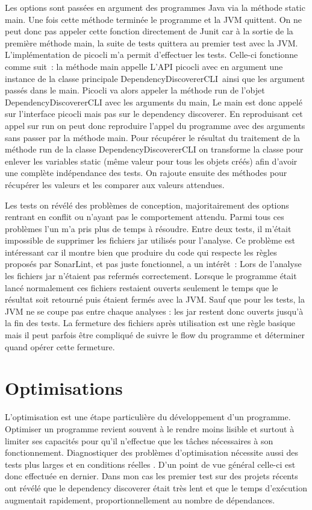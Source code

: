 \documentclass[french,a4paper,12pt]{report}
\begin{document}
Les options sont passées en argument des programmes Java via la méthode static main. Une fois cette méthode terminée le programme et la JVM quittent. On ne peut donc pas appeler cette fonction directement de Junit car à la sortie de la première méthode main, la suite de tests quittera au premier test avec la JVM. 
L’implémentation de picocli m’a permit d’effectuer les tests. Celle-ci fonctionne comme suit : la méthode main appelle L’API picocli avec en argument une instance de la classe principale DependencyDiscovererCLI ainsi que les argument passés dans le main.
Picocli va alors appeler la méthode run de l'objet DependencyDiscovererCLI avec les arguments du main, Le main est donc appelé sur l'interface picocli mais pas sur le dependency discoverer.
En reproduisant cet appel sur run on peut donc reproduire l’appel du programme avec des arguments sans passer par la méthode main.
Pour récupérer le résultat du traitement de la méthode run de la classe DependencyDiscovererCLI on transforme la classe pour enlever les variables static (même valeur pour tous les objets créés) afin d’avoir une complète indépendance des tests. On rajoute ensuite des méthodes pour récupérer les valeurs et les comparer aux valeurs attendues.

Les tests on révélé des problèmes de conception, majoritairement des options rentrant en conflit ou n’ayant pas le comportement attendu. Parmi tous ces problèmes l'un m’a pris plus de temps à résoudre. Entre deux tests, il m’était impossible de supprimer les fichiers jar utilisés pour l’analyse. Ce problème est intéressant car il montre bien que produire du code qui respecte les règles proposés par SonarLint,  et pas juste fonctionnel, a un intérêt : 
Lors de l'analyse les fichiers jar n'étaient pas refermés correctement. Lorsque le programme était lancé normalement ces fichiers restaient ouverts seulement le temps que le résultat soit retourné puis étaient fermés avec la JVM. Sauf que pour les tests, la JVM ne se coupe pas entre chaque analyses : les jar restent donc ouverts jusqu’à la fin des tests. 
La fermeture des fichiers après utilisation est une règle basique mais il peut parfois être compliqué de suivre le flow du programme et déterminer quand opérer cette fermeture.

\section{Optimisations}
L’optimisation est une étape particulière du développement d’un programme. Optimiser un programme revient souvent à le rendre moins lisible et surtout à limiter ses capacités pour qu’il n’effectue que les tâches nécessaires à son fonctionnement. Diagnostiquer des problèmes d’optimisation nécessite aussi des tests plus larges et en conditions réelles . D’un point de vue général celle-ci est donc effectuée en dernier. 
Dans mon cas les premier test sur des projets récents ont révélé que le dependency discoverer était très lent et que le temps d’exécution augmentait rapidement, proportionnellement au nombre de dépendances. 
\end{document}
